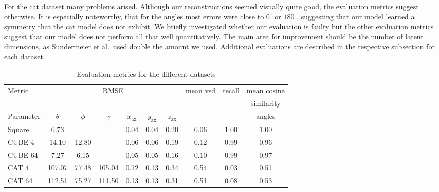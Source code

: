 \documentclass[10pt,a4paper]{article}
\begin{document}
For the cat dataset many problems arised. Although our reconstructions seemed
visually quite good, the evaluation metrics suggest otherwise. It is especially
noteworthy, that for the angles most errors were close to $0^{\circ}$ or
$180^{\circ}$, suggesting that our model learned a symmetry that the cat model
does not exhibit. We briefly investigated whether our evaluation is faulty but
the other evaluation metrics suggest that our model does not perform all that
well quantitatively. The main area for improvement should be the number of
latent dimensions, as Sundermeier et al.~used double the amount we used.
Additional evaluations are described in the respective subsection for each
dataset.
\begin{table}
    \begin{adjustbox}{width=\textwidth}
        \begin{tabular}[width = \textwidth]{lccccccccc} 
            Metric & \multicolumn{6}{c}{RMSE} & mean vsd & recall & mean cosine \\
                   &&&&&&&&& similarity \\
            \hline
            Parameter & $\theta$ & $\phi$ & $\gamma$ & $x_{\text{ax}}$  &
            $y_{\text{ax}}$ & $z_{\text{ax}}$ &       &      & angles\\
            \hline
            Square        & 0.73     &        &          & 0.04             & 0.04            & 0.20            & 0.06  & 1.00 & 1.00 \\
            CUBE 4        & 14.10    & 12.80  &          & 0.06             & 0.06
                          & 0.19     & 0.12   & 0.99     & 0.96            \\
            CUBE 64       & 7.27    & 6.15  &          & 0.05             & 0.05
                          & 0.16     & 0.10   & 0.99     & 0.97            \\
            CAT 4         & 107.07   & 77.48  & 105.04   & 0.12             & 0.13
                          & 0.34     & 0.54 & 0.03 & 0.51    \\
            CAT 64        & 112.51   & 75.27  & 111.50   & 0.13             & 0.13
                          & 0.31     & 0.51 & 0.08 & 0.53    \\
        \end{tabular}
    \end{adjustbox}
    \caption{Evaluation metrics for the different datasets}
    \label{square_results}
\end{table}
\end{document}
